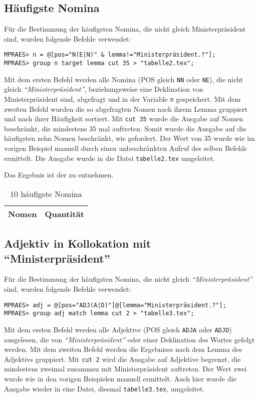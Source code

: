 \documentclass[%
	type=document,%
  	style=article,%
  	media=print,
  	pages=oneside,%
  	prefixLecturer=Dozenten:,
  	author=multiple,
]{unihildesheim} %
\begin{document}
\subsection{Häufigste Nomina}
Für die Bestimmung der häufigsten Nomina, die nicht gleich Ministerpräsident
sind, wurden folgende Befehle verwendet:
\begin{Verbatim}[frame=single,label=CQP,commandchars=\\\{\}]
MPRAES> n = @[pos="N(E|N)" & lemma!="Ministerpräsident.?"];
MPRAES> group n target lemma cut 35 > "tabelle2.tex";
\end{Verbatim}

Mit dem ersten Befehl werden alle Nomina (POS gleich \texttt{NN} oder
\texttt{NE}), die nicht gleich \textit{"`Ministerpräsident"'}, beziehungsweise eine
Deklination von Ministerpräsident sind, abgefragt und in der Variable \texttt{n}
gespeichert. Mit dem zweiten Befehl wurden die so abgefragten Nomen nach ihrem Lemma gruppiert und
nach ihrer Häufigkeit sortiert. Mit \texttt{cut 35} wurde die Ausgabe auf Nomen
beschränkt, die mindestens 35 mal auftreten. Somit wurde die Ausgabe auf die
häufigsten zehn Nomen beschränkt, wie gefordert. Der Wert von 35 wurde wie im
vorigen Beispiel manuell durch einen unbeschränkten Aufruf des selben
Befehls ermittelt. Die Ausgabe wurde in die Datei \texttt{tabelle2.tex}
umgeleitet.

Das Ergebnis ist der  zu entnehmen.
\begin{table}[htpb]\label{t}
	\center
	\begin{tabularx}{0.35\textwidth}{lr}
		\toprule
		\textbf{Nomen} & \textbf{Quantität}\\
		\midrule
		
		\bottomrule
	\end{tabularx}
	\caption{10 häufigste Nomina}
	\label{tab:nomina}
\end{table}

\subsection{Adjektiv in Kollokation mit "`Ministerpräsident"'}
Für die Bestimmung der häufigsten Nomina, die nicht gleich
\textit{"`Ministerpräsident"'} sind, wurden folgende Befehle verwendet:
\begin{Verbatim}[frame=single,label=CQP,commandchars=\\\{\}]
MPRAES> adj = @[pos="ADJ(A|D)"]@[lemma="Ministerpräsident.?"];
MPRAES> group adj match lemma cut 2 > "tabelle3.tex";
\end{Verbatim}
Mit dem ersten Befehl werden alle Adjektive (POS gleich \texttt{ADJA} oder
\texttt{ADJD}) ausgelesen, die von \textit{"`Ministerpräsident"'} oder einer
Deklination des Wortes gefolgt werden. Mit dem zweiten Befehl werden die
Ergebnisse nach dem Lemma des Adjektivs gruppiert. Mit \texttt{cut 2} wird die Ausgabe auf Adjektive begrenzt,
die mindestens zweimal zusammen mit Ministerpräsident auftreten. Der Wert zwei
wurde wie in den vorigen Beispielen manuell ermittelt. Auch hier wurde die Ausgabe
wieder in eine Datei, diesmal \texttt{tabelle3.tex}, umgeleitet. 
\end{document}
